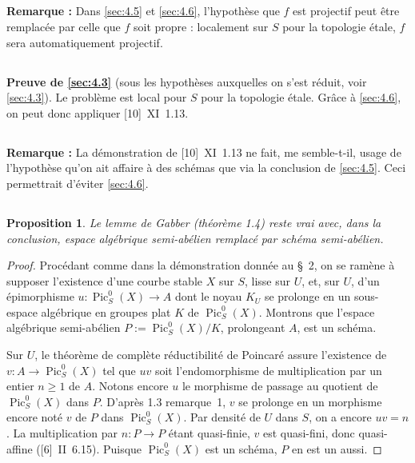 \documentclass[12pt,a4paper]{article}
\theoremstyle{plain}
\newtheorem{proposition}[theorem]{Proposition}
\theoremstyle{definition}
\theoremstyle{remark}
\DeclareMathOperator{\Pic}{Pic}
\begin{document}
\subsection{}
\textbf{Remarque :} Dans \ref{sec:4.5} et \ref{sec:4.6}, l'hypothèse que $f$ est projectif peut être remplacée par celle que $f$ soit propre : localement sur $S$ pour la topologie étale, $f$ sera automatiquement projectif.

\subsection{}
\textbf{Preuve de \ref{sec:4.3}} (sous les hypothèses auxquelles on s'est réduit, voir \ref{sec:4.3}). Le problème est local pour $S$ pour la topologie étale. Grâce à \ref{sec:4.6}, on peut donc appliquer [10]~XI~1.13.

\subsection{}
\textbf{Remarque :} La démonstration de [10]~XI~1.13 ne fait, me semble-t-il, usage de l'hypothèse qu'on ait affaire à des schémas que via la conclusion de \ref{sec:4.5}. Ceci permettrait d'éviter \ref{sec:4.6}.

\subsection{}

\begin{proposition}
Le lemme de Gabber (théorème 1.4) reste vrai avec, dans la conclusion, espace algébrique semi-abélien remplacé par schéma semi-abélien.
\end{proposition}

\begin{proof}
Procédant comme dans la démonstration donnée au \S~2, on se ramène à supposer l'existence d'une courbe stable $X$ sur $S$, lisse sur $U$, et, sur $U$, d'un épimorphisme $u : \Pic_S^0(X) \to A$ dont le noyau $K_U$ se prolonge en un sous-espace algébrique en groupes plat $K$ de $\Pic_S^0(X)$. Montrons que l'espace algébrique semi-abélien $P := \Pic_S^0(X)/K$, prolongeant $A$, est un schéma.

Sur $U$, le théorème de complète réductibilité de Poincaré assure l'existence de $v : A \to \Pic_S^0(X)$ tel que $uv$ soit l'endomorphisme de multiplication par un entier $n \geq 1$ de $A$. Notons encore $u$ le morphisme de passage au quotient de $\Pic_S^0(X)$ dans $P$. D'après 1.3 remarque~1, $v$ se prolonge en un morphisme encore noté $v$ de $P$ dans $\Pic_S^0(X)$. Par densité de $U$ dans $S$, on a encore $uv = n$. La multiplication par $n : P \to P$ étant quasi-finie, $v$ est quasi-fini, donc quasi-affine ([6]~II~6.15). Puisque $\Pic_S^0(X)$ est un schéma, $P$ en est un aussi.
\end{proof}
\end{document}
